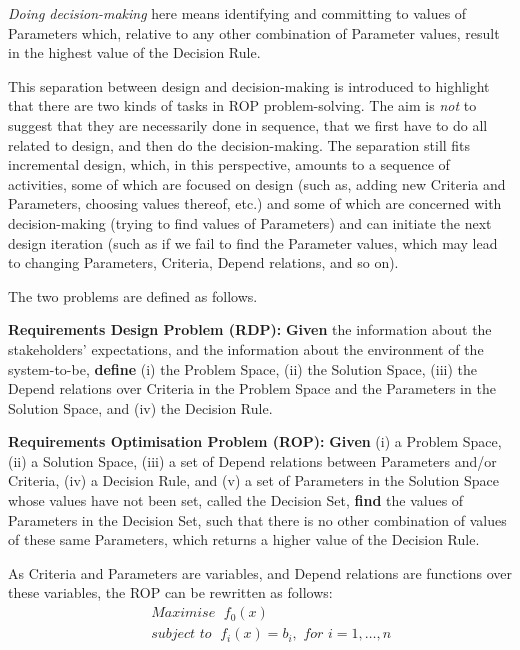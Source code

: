 \documentclass[graybox]{svmult}
\newcommand{\zi}[1]{\textit{#1}}
\newcommand{\xb}[1]{\textbf{#1}}
\newcommand{\SolutionSpace}{Solution Space}
\newcommand{\ProblemSpace}{Problem Space}
\newcommand{\Criteria}{Criteria}
\newcommand{\Parameter}{Parameter}
\newcommand{\Depend}{Depend}
\newcommand{\DecisionRule}{Decision Rule}
\newcommand{\ROPfull}{Requirements Optimisation Problem}
\newcommand{\ROP}{ROP}
\newcommand{\DecisionSet}{Decision Set}
\newcommand{\RDPfull}{Requirements Design Problem}
\newcommand{\RDP}{RDP}
\begin{document}
\zi{Doing decision-making} here means identifying and committing to values of \Parameter s which, relative to any other combination of \Parameter{} values, result in the highest value of the  \DecisionRule. 

This separation between design and decision-making is introduced to highlight that there are two kinds of tasks in \ROP{} problem-solving. The aim is \zi{not} to suggest that they are necessarily done in sequence, that we first have to do all related to design, and then do the decision-making. The separation still fits incremental design, which, in this perspective, amounts to a sequence of activities, some of which are focused on design (such as, adding new \Criteria{} and \Parameter s, choosing values thereof, etc.) and some of which are concerned with decision-making (trying to find values of \Parameter s) and can initiate the next design iteration (such as if we fail to find the \Parameter{} values, which may lead to changing \Parameter s, \Criteria, \Depend{} relations, and so on).

The two problems are defined as follows.

\begin{definition}\label{d:rdp}
\xb{\RDPfull{} (\RDP):} \xb{Given} the information about the stakeholders' expectations, and the information about the environment of the system-to-be, \xb{define} (i) the \ProblemSpace, (ii) the \SolutionSpace, (iii) the \Depend{} relations over \Criteria{} in the \ProblemSpace{} and the \Parameter s in the \SolutionSpace, and (iv) the \DecisionRule.
\end{definition}


\begin{definition}\label{d:rop}
\xb{\ROPfull{} (\ROP):} \xb{Given} (i) a \ProblemSpace, (ii) a \SolutionSpace, (iii) a set of \Depend{} relations between \Parameter s and/or \Criteria, (iv) a \DecisionRule, and (v) a set of \Parameter s in the \SolutionSpace{} whose values have not been set, called the \DecisionSet{}, \xb{find} the values of \Parameter s in the \DecisionSet, such that there is no other combination of values of these same \Parameter s, which returns a higher value of the \DecisionRule.
\end{definition}

As \Criteria{} and \Parameter s are variables, and \Depend{} relations are functions over these variables, the \ROP{} can be rewritten as follows:
\begin{eqnarray*}
& & \zi{Maximise }\; f_{0}(x) \\
& & \zi{subject to }\; f_{i}(x) = b_{i}, \zi{ for } i = 1, \ldots, n
\end{eqnarray*}
\end{document}
